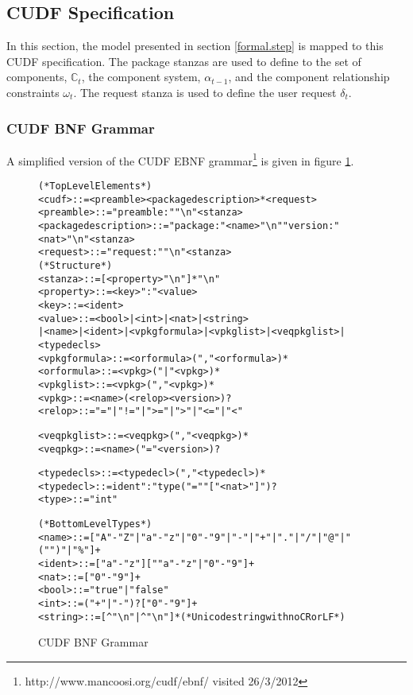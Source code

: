 \subsection{CUDF Specification}
In this section, the model presented in section \ref{formal.step} is mapped to this CUDF specification.
The package stanzas are used to define to the set of components, $\mathbb{C}_t$, the component system, $\alpha_{t-1}$, and the component relationship constraints $\omega_t$. 
The request stanza is used to define the user request $\delta_t$. 

\subsubsection{CUDF BNF Grammar}
A simplified version of the CUDF EBNF grammar\footnote{http://www.mancoosi.org/cudf/ebnf/ visited 26/3/2012} is given in figure \ref{formal.cudfBNFgrammar}. 

\begin{figure}[htp] 
\begin{center}
\begin{alltt}
(* Top Level Elements *)
<cudf> ::= <preamble> <packagedescription>* <request>
<preamble> ::= "preamble:" "\textbackslash{}n" <stanza>
<packagedescription> ::= "package:" <name> "\textbackslash{}n" "version:" <nat> "\textbackslash{}n" <stanza>
<request> ::= "request:" "\textbackslash{}n" <stanza>
(* Structure *)
<stanza> ::= [<property> "\textbackslash{}n"]* "\textbackslash{}n"
<property> ::= <key> ":" <value>
<key> ::= <ident>
<value> ::= <bool> | <int> | <nat> | <string> \\| <name> | <ident> | <vpkgformula> | <vpkglist> | <veqpkglist> | <typedecls>
<vpkgformula> ::= <orformula> ("," <orformula>)*
<orformula> ::= <vpkg> ("|" <vpkg>)*
<vpkglist> ::= <vpkg> ("," <vpkg>)*
<vpkg> ::= <name> (<relop> <version>)?
<relop> ::= "=" | "!=" | ">=" | ">" | "<=" | "<"

<veqpkglist> ::= <veqpkg> ("," <veqpkg>)*
<veqpkg> ::= <name> ("=" <version>)?

<typedecls> ::= <typedecl> ("," <typedecl>)*
<typedecl> ::= ident ":" type ("=" "["<nat>"]")?
<type> ::= "int"

(* Bottom Level Types *)
<name> ::= ["A"-"Z" | "a"-"z" | "0"-"9" | "-" | "+" | "." | "/" | "@" | "(" ")" | "\%"]+
<ident> ::= ["a"-"z"][""a"-"z" | "0"-"9"]+		
<nat> ::= ["0"-"9"]+
<bool> ::= "true" | "false"
<int> ::= ("+"|"-")? ["0"-"9"]+
<string> ::= [^"\textbackslash{}n"| ^"\textbackslash{}n"]* (*Unicode string with no CR or LF*)
\end{alltt}
  \caption{CUDF BNF Grammar}
  \label{formal.cudfBNFgrammar}
\end{center}
\end{figure}

